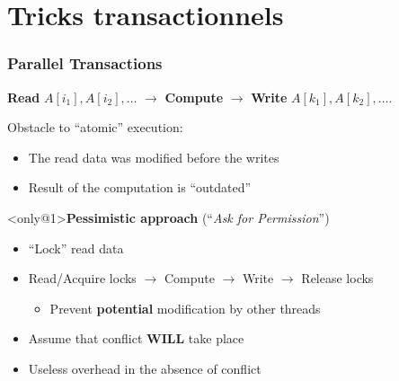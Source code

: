 \documentclass[xcolor={x11names,svgnames},x11names,svgnames]{beamer}
\begin{document}

\section{Tricks transactionnels}

\begin{frame}[label=transactions]
  \frametitle{Parallel Transactions}

  \textbf{Read} $A[i_1], A[i_2], \dots$ $\rightarrow$ \textbf{Compute} $\rightarrow$ \textbf{Write} $A[k_1], A[k_2], \dots$.

  \medskip

  \begin{block}{Obstacle to ``atomic'' execution:}
    \begin{itemize}
    \item The read data was modified before the writes
    \item Result of the computation is ``outdated''
    \end{itemize}
  \end{block}
  
  \begin{overlayarea}{\textwidth}{4cm}
  \begin{alertblock}<only@1>{\textbf{Pessimistic approach} (``\textit{Ask for Permission}'')}
    \begin{itemize}
    \item ``Lock'' read data
    \item Read/Acquire locks $\rightarrow$ Compute $\rightarrow$ Write $\rightarrow$ Release locks
      \begin{itemize}
      \item Prevent \textbf{potential} modification by other threads
      \end{itemize}
    \item Assume that conflict \textbf{WILL} take place
    \item Useless overhead in the absence of conflict
    \end{itemize}
  \end{alertblock}


\end{overlayarea}
\end{frame}
\end{document}
